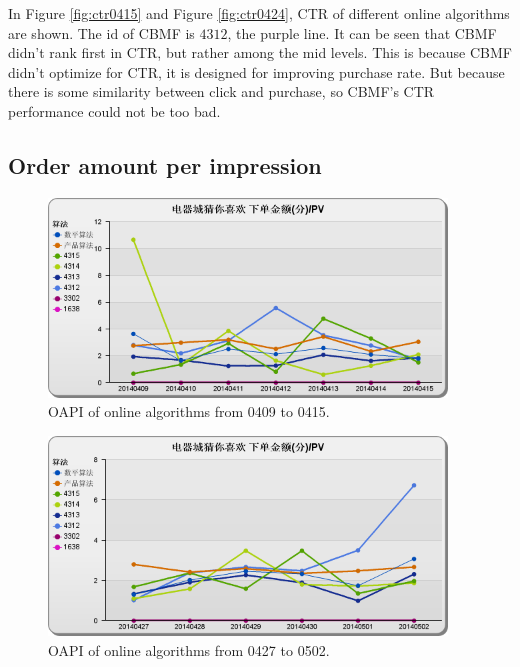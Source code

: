 In Figure \ref{fig:ctr0415} and Figure \ref{fig:ctr0424}, CTR of different online algorithms are shown. The id of CBMF is $4312$, the purple line. It can be seen that CBMF didn't rank first in CTR, but rather among the mid levels. This is because CBMF didn't optimize for CTR, it is designed for improving purchase rate. But because there is some similarity between click and purchase, so CBMF's CTR performance could not be too bad.

\subsection{Order amount per impression}

\begin{figure}
\begin{center}

\includegraphics[width=400px]{fig/yixunexp/OAPI0415.png}
\caption{\label{fig:oapi0415} OAPI of online algorithms  from 0409 to 0415.}
\end{center}
\end{figure}

\begin{figure}
\begin{center}



\includegraphics[width=400px]{fig/yixunexp/OAPI0427.png}
\caption{\label{fig:oapi0427} OAPI of online algorithms  from 0427 to 0502.}
\end{center}
\end{figure}

